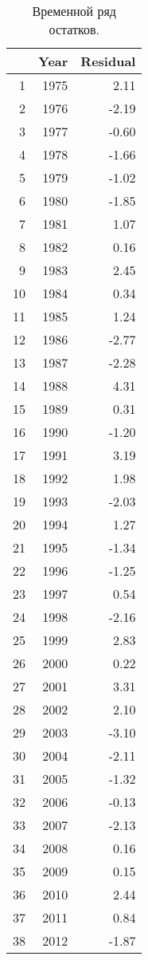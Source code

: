 \begin{table}[H]
\centering
\begin{tabular}{rrr}
  \hline
 & Year & Residual \\ 
  \hline
1 & 1975 & 2.11 \\ 
  2 & 1976 & -2.19 \\ 
  3 & 1977 & -0.60 \\ 
  4 & 1978 & -1.66 \\ 
  5 & 1979 & -1.02 \\ 
  6 & 1980 & -1.85 \\ 
  7 & 1981 & 1.07 \\ 
  8 & 1982 & 0.16 \\ 
  9 & 1983 & 2.45 \\ 
  10 & 1984 & 0.34 \\ 
  11 & 1985 & 1.24 \\ 
  12 & 1986 & -2.77 \\ 
  13 & 1987 & -2.28 \\ 
  14 & 1988 & 4.31 \\ 
  15 & 1989 & 0.31 \\ 
  16 & 1990 & -1.20 \\ 
  17 & 1991 & 3.19 \\ 
  18 & 1992 & 1.98 \\ 
  19 & 1993 & -2.03 \\ 
  20 & 1994 & 1.27 \\ 
  21 & 1995 & -1.34 \\ 
  22 & 1996 & -1.25 \\ 
  23 & 1997 & 0.54 \\ 
  24 & 1998 & -2.16 \\ 
  25 & 1999 & 2.83 \\ 
  26 & 2000 & 0.22 \\ 
  27 & 2001 & 3.31 \\ 
  28 & 2002 & 2.10 \\ 
  29 & 2003 & -3.10 \\ 
  30 & 2004 & -2.11 \\ 
  31 & 2005 & -1.32 \\ 
  32 & 2006 & -0.13 \\ 
  33 & 2007 & -2.13 \\ 
  34 & 2008 & 0.16 \\ 
  35 & 2009 & 0.15 \\ 
  36 & 2010 & 2.44 \\ 
  37 & 2011 & 0.84 \\ 
  38 & 2012 & -1.87 \\ 
   \hline
\end{tabular}
\caption{Временной ряд остатков.} 
\label{table:residuals}
\end{table}
